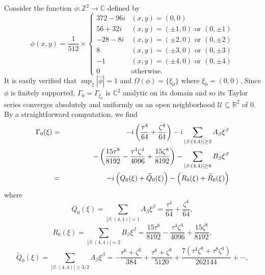 \documentclass[11pt, letter]{book}
\newenvironment{example}
  {\pushQED{\qed}\renewcommand{\qedsymbol}{$\triangle$}\examplex}
  {\popQED\endexamplex}
\newcommand{\lp}{\left(}
\newcommand{\rp}{\right)}
\newcommand{\f}[2]{\frac{#1}{#2}}
\begin{document}
\begin{example}\normalfont


Consider the function $\phi : \mathbb{Z}^2 \to \mathbb{C}$ defined by 
\begin{equation*}
    \phi(x,y) =
    \frac{1}{512}\times
    \begin{cases}
    372 - 96i &(x,y) = (0,0)\\
    56+32i &(x,y) = (\pm 1, 0)\mbox{ or }(0,\pm 1)\\
    -28-8i        &(x,y) = (\pm 2,0)\mbox{ or }(0,\pm 2)\\
    8       &(x,y) = (\pm 3,0)\mbox{ or }(0,\pm 3)\\
    -1        &(x,y) = (\pm 4,0)\mbox{ or }(0,\pm 4)\\
    0& \text{otherwise}.
    \end{cases}
\end{equation*}
It is easily verified that $\sup_{\xi}|\widehat{\phi}|=1$ and $\Omega(\phi) = \{\xi_0 \}$ where $\xi_0=(0,0)$. Since $\phi$ is finitely supported, $\Gamma_{0}=\Gamma_{\xi_0}$ is $\mathbb{C}^2$ analytic on its domain and so its Taylor series converges absolutely and uniformly on an open neighborhood $\mathcal{U}\subseteq \mathbb{R}^2$ of $0$. By a straightforward computation, we find 
\begin{eqnarray*}
\Gamma_{0}(\xi)
&=& 
-i\lp \frac{\tau^4}{64} + \frac{\zeta^4}{64}   \rp
-i \sum_{|\beta:(4,4)|\geq 2}A_\beta \xi^\beta\\
&& 
\hspace{1.3cm}
-\lp \f{15\tau^8}{8192} - \f{\tau^4\zeta^4}{4096} + \f{15\zeta^8}{8192}   \rp 
- \sum_{|\beta:(4,4)|\geq 6}B_\beta \xi^\beta\\
&=&-i\lp Q_{0}(\xi)+\widetilde{Q}_{0}(\xi)\rp-\lp R_0(\xi)+\widetilde{R}_0(\xi)\rp
\end{eqnarray*}
where
\begin{equation*}
Q_{0}(\xi)=\sum_{|\beta:(4,4)|=1}A_\beta \xi^\beta=\frac{\tau^4}{64} + \frac{\zeta^4}{64} ,
\end{equation*}
\begin{equation*}
R_{0}(\xi)=\sum_{|\beta:(4,4)|=2}B_\beta\xi^\beta
=  \f{15\tau^8}{8192} - \f{\tau^4\zeta^4}{4096} + \f{15\zeta^8}{8192}  , 
\end{equation*}
\begin{equation*}
\widetilde{Q}_{0}(\xi)= \sum_{|\beta:(4,4)| \geq 3/2}A_\beta \xi^\beta= 
-\f{\tau^6+\zeta^6}{384}  + \f{\tau^8 + \zeta^8}{5120}+  \f{7(\tau^4\zeta^8+\tau^8\zeta^4)}{262144} +
\cdots, 
\end{equation*}

\end{example}
\end{document}
